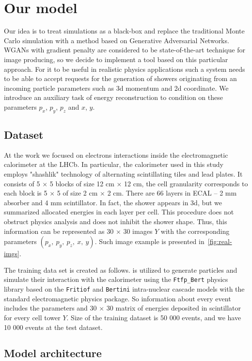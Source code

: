 \section{Our model} \label{sec:model}
Our idea is to treat simulations as a black-box and replace the traditional Monte Carlo simulation with a method based on Generative Adversarial Networks. WGANs with gradient penalty are considered to be state-of-the-art technique for image producing, so we decide to implement a tool based on this particular approach. For it to be useful in realistic physics applications such a system needs to be able to accept requests for the generation of showers originating from an incoming particle parameters such as 3d momentum and 2d coordinate. We introduce an auxiliary task of energy reconstruction to condition on these parameters $p_x$, $p_y$, $p_z$ and $x$, $y$.

\subsection{Dataset}
At the work we focused on electrons interactions inside the electromagnetic calorimeter at the LHCb. In particular, the calorimeter used in this study employs "shashlik" technology of alternating scintillating tiles and lead plates. It consists of 5 $\times$ 5 blocks of size 12 cm $\times$ 12 cm, the cell granularity corresponds to each block is 5 $\times$ 5 of size 2 cm $\times$ 2 cm. There are 66 layers in ECAL -- 2 mm absorber and 4 mm scintillator. In fact, the shower appears in 3d, but we summarized allocated energies in each layer per cell. This procedure does not obstruct physics analysis and does not inhibit the shower shape. Thus, this information can be represented as 30 $\times$ 30 images $Y$ with the corresponding parameters $(p_x,~ p_y,~ p_z,~ x,~ y)$. Such image example is presented in~\cref{fig:real-imgs}.

The training data set is created as follows. \geant is utilized to generate particles and simulate their interaction with the calorimeter using the \texttt{Ftfp\_Bert} physics library based on the \texttt{Fritiof}  and \texttt{Bertini} intra-nuclear cascade models with the standard electromagnetic physics package. So information about every event includes the parameters and 30 $\times$ 30 matrix of energies deposited in scintillator for every cell tower $Y$. Size of the training dataset is 50 000 events, and we have 10 000 events at the test dataset.

\subsection{Model architecture}



